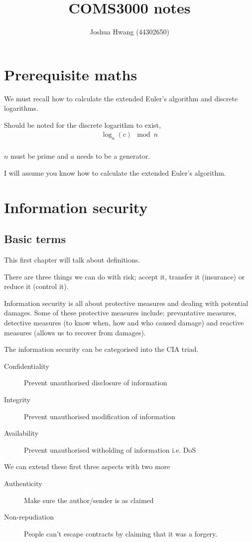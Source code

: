 \documentclass{report}
\title{COMS3000 notes}
\author{Joshua Hwang (44302650)}
\begin{document}
\maketitle
\tableofcontents
\chapter*{Prerequisite maths}
We must recall how to calculate the extended Euler's algorithm and discrete
logarithms.

Should be noted for the discrete logarithm to exist,
\begin{align*}
    \log_a (c) \mod n \\
\end{align*}

$n$ must be prime and $a$ needs to be a generator.

I will assume you know how to calculate the extended Euler's algorithm.

\chapter{Information security}
\section{Basic terms}
This first chapter will talk about definitions.

There are three things we can do with risk; accept it, transfer it (insurance)
or reduce it (control it).

Information security is all about protective measures and dealing with potential
damages. Some of these protective measures include; prevantative measures,
detective measures (to know when, how and who caused damage) and reactive
measures (allows us to recover from damages).

The information security can be categorised into the CIA triad.
\begin{description}
    \item [Confidentiality] Prevent unauthorised disclosure of information
    \item [Integrity] Prevent unauthorised modification of information
    \item [Availability] Prevent unauthorised witholding of information i.e. DoS
\end{description}

We can extend these first three aspects with two more
\begin{description}
    \item [Authenticity] Make sure the author/sender is as claimed
    \item [Non-repudiation] People can't escape contracts by claiming that it
        was a forgery.
\end{description}
\end{document}
